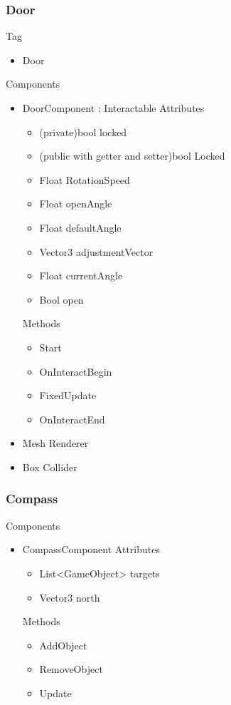 \documentclass[11pt]{article}
\begin{document}
\subsubsection{Door}
Tag
\begin{itemize}
\item Door
\end{itemize}
Components
\begin{itemize}
\item DoorComponent : Interactable
\newline Attributes
\begin{itemize}
\item (private)bool locked
\item (public with getter and setter)bool Locked
\item Float RotationSpeed
\item Float openAngle
\item Float defaultAngle
\item Vector3 adjustmentVector
\item Float currentAngle
\item Bool open
\end{itemize}
Methods
\begin{itemize}
\item Start
\item OnInteractBegin
\item FixedUpdate
\item OnInteractEnd
\end{itemize}
\item Mesh Renderer
\item Box Collider
\end{itemize}

\subsubsection{Compass}
Components
\begin{itemize}
\item CompassComponent
\newline Attributes
\begin{itemize}
\item List<GameObject> targets
\item Vector3 north
\end{itemize}
Methods
\begin{itemize}
\item AddObject
\item RemoveObject
\item Update
\end{itemize}
\end{itemize}
\end{document}
